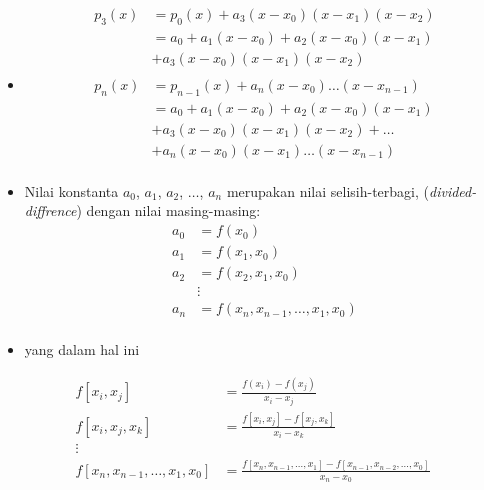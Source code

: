 \documentclass[pdflatex,compress,mathserif]{beamer}
\begin{document}
\begin{frame}
	\begin{itemize}
		\item[]
		\begin{align*}
			p_3(x) &= p_0(x) + a_3 (x - x_0)(x - x_1)(x - x_2) \\
			&= a_0 + a_1 (x - x_0) + a_2 (x - x_0)(x - x_1)\\
			&+ a_3 (x - x_0)(x - x_1)(x - x_2)\\
			&\\
			p_n(x) &= p_{n-1}(x) + a_n (x - x_0)\dots(x - x_{n-1})\\
			&= a_0 + a_1 (x - x_0) + a_2 (x - x_0)(x - x_1)\\
			&+ a_3 (x - x_0)(x - x_1)(x - x_2) + \dots \\
			&+  a_n (x - x_0)(x - x_1)\dots(x - x_{n-1})\\
		\end{align*}
	\end{itemize}
\end{frame}

\begin{frame}
	\begin{itemize}
		\item Nilai konstanta $ a_0 $, $ a_1 $, $ a_2 $, $\dots$, $ a_n $ merupakan nilai selisih-terbagi, (\textit{divided-diffrence}) dengan nilai masing-masing:
		\begin{align*}
		a_0 &= f(x_0) \\
		a_1 &= f(x_1,x_0) \\
		a_2 &= f(x_2,x_1,x_0) \\
		&\vdots\\
		a_n &= f(x_n, x_{n-1}, \dots, x_1, x_0) \\
		\end{align*}
	\end{itemize}
\end{frame}

\begin{frame}
	\begin{itemize}
		\item yang dalam hal ini
	\end{itemize}
	\begin{align*}
		f[x_i, x_j] &= \frac{f(x_i)-f(x_j)}{x_i - x_j} \\
		f[x_i, x_j, x_k] &= \frac{f[x_i, x_j] - f[x_j, x_k]}{x_i - x_k} \\
		\vdots&\\
		f[x_n, x_{n-1}, \dots, x_1, x_0] &= \frac{f[x_n, x_{n-1}, \dots, x_1] - f[x_{n-1},x_{n-2},\dots, x_0]}{x_n - x_0}
	\end{align*}
\end{frame}
\end{document}
